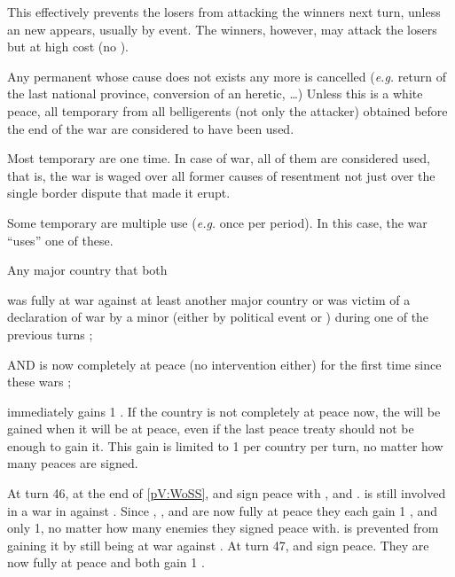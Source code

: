 \begin{designnote}
  This effectively prevents the losers from attacking the winners next turn,
  unless an new \CB appears, usually by event. The winners, however, may
  attack the losers but at high cost (no \CB).
\end{designnote}

\bparag Any permanent \CB whose cause does not exists any more is cancelled
(\emph{e.g.} return of the last national province, conversion of an heretic,
\ldots)
\bparag Unless this is a white peace, all temporary \CB from all belligerents
(not only the attacker) obtained before the end of the war are considered to
have been used.

\begin{designnote}[Temporary \CB]
  Most temporary \CB are one time. In case of war, all of them are considered
  used, that is, the war is waged over all former causes of resentment not
  just over the single border dispute that made it erupt.

  Some temporary \CB are multiple use (\emph{e.g.} once per period). In this
  case, the war ``uses'' one of these.
\end{designnote}

\label{chPeace:Peace and Stability}
Any major country that both
\begin{modlist}
\item was fully at war against at least another major country or was victim of
  a declaration of war by a minor (either by political event or \RD) during
  one of the previous turns ;
\item[AND] is now completely at peace (no intervention either) for the first
  time since these wars ;
\end{modlist}
immediately gains 1 \STAB.
\bparag If the country is not completely at peace now, the \STAB will be
gained when it will be at peace, even if the last peace treaty should not be
enough to gain it.
\bparag This gain is limited to 1 \STAB per country per turn, no matter how
many peaces are signed.

\begin{exemple}
  At turn 46, at the end of \ref{pV:WoSS}, \FRA and \HIS sign peace with \ANG,
  \HOL and \AUS. \AUS is still involved in a war in \paysHongrie against
  \TUR. Since \FRA, \HIS, \ANG and \HOL are now fully at peace they each gain
  1 \STAB, and only 1, no matter how many enemies they signed peace with. \AUS
  is prevented from gaining it by still being at war against \TUR. At turn 47,
  \AUS and \TUR sign peace. They are now fully at peace and both gain 1 \STAB.
\end{exemple}

